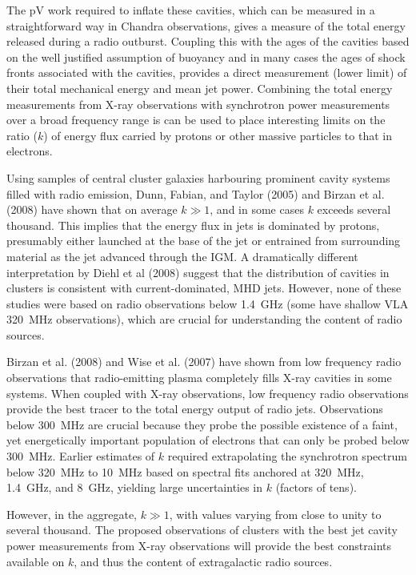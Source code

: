 \documentclass{article}
\begin{document}
The pV work required to
inflate these cavities, which can be
measured in a straightforward way in Chandra observations,
gives a measure of the total energy released during a radio outburst.
Coupling this with the ages of the cavities based on the well
justified assumption of buoyancy and in many cases the ages of shock
fronts associated with the cavities, provides a direct measurement
(lower limit) of their total mechanical energy and mean jet power.
Combining the total energy measurements from X-ray observations with
synchrotron power measurements over a broad frequency range is can be
used to place interesting limits on the ratio ($k$) of energy flux
carried by protons or other massive particles to that in electrons.

Using samples of central cluster galaxies harbouring prominent cavity
systems filled with radio emission, Dunn, Fabian, and Taylor (2005)
and Birzan et al. (2008) have shown that on average $k \gg 1$, and in
some cases $k$ exceeds several thousand.  This implies that the energy
flux in jets is dominated by protons, presumably
either launched at the
base of the jet or  entrained from surrounding material as
the jet advanced through the IGM.  A dramatically
different interpretation by Diehl et al (2008) suggest
that the distribution of cavities in clusters is consistent with
current-dominated, MHD jets.  However, none of these studies were
based on radio observations below 1.4~GHz (some have shallow 
VLA 320~MHz observations), which are crucial for
understanding the content of radio sources.

Birzan et al. (2008) and Wise et al. (2007) have shown from low
frequency radio observations that radio-emitting plasma completely
fills X-ray cavities in some systems.  When coupled with X-ray
observations, low frequency radio observations provide the best tracer
to the total energy output of radio jets.  Observations below 300~MHz
are crucial because they probe the possible existence of a faint, yet
energetically important population of electrons that can only be
probed below 300~MHz.  Earlier estimates of $k$ required extrapolating
the synchrotron spectrum below 320~MHz to 10~MHz based on spectral
fits anchored at 320~MHz, 1.4~GHz, and 8~GHz, yielding large
uncertainties in $k$ (factors of tens).  

However, in the aggregate, $k
\gg 1$, with values varying from close to unity to several thousand. The
proposed observations of clusters with the best jet cavity power
measurements from X-ray observations will provide the best constraints
available on $k$, and thus the content of extragalactic radio sources.
\end{document}
